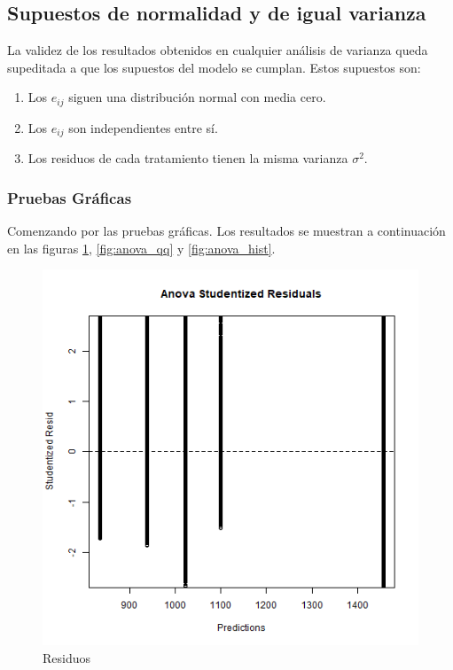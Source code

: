 \documentclass[a4paper,10pt,twocolumn]{article}
\begin{document}
 \subsection{Supuestos de normalidad y de igual varianza}
 
 La validez de los resultados obtenidos en cualquier an\'alisis de varianza queda supeditada a que los
 supuestos del modelo se cumplan. Estos supuestos son:
 
 \begin{enumerate}
 	\item Los $e_{ij}$ siguen una distribuci\'on normal con media cero.
 	\item Los $e_{ij}$ son independientes entre s\'i.
 	\item Los residuos de cada tratamiento tienen la misma varianza $\sigma^2$.
 \end{enumerate}

 \subsubsection{Pruebas Gráficas}
 
  Comenzando por las pruebas gr\'aficas. Los resultados se muestran a continuaci\'on en las figuras \ref{fig:anova_residuals}, \ref{fig:anova_qq} y \ref{fig:anova_hist}.
 
 \begin{figure}[h!]
 	\centering
 	\includegraphics[width=\linewidth]{Images/anova_studentized_residuals.png}
 	\caption{Residuos}
 	\label{fig:anova_residuals}
 \end{figure}
 
\end{document}
